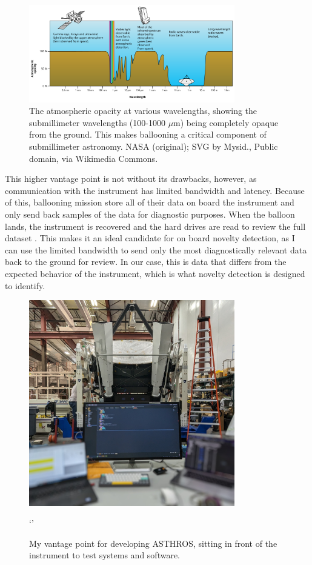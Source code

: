 \begin{figure}
\centering
\includegraphics[width=0.8\textwidth]{figs/intro/atmosphere.png}
\caption[Atmospheric Opacity at Various Wavelengths]{
    The atmospheric opacity at various wavelengths, showing the submillimeter wavelengths (100-1000 $\mu$m) being completely opaque from the ground.
    This makes ballooning a critical component of submillimeter astronomy. NASA (original); SVG by Mysid., Public domain, via Wikimedia Commons.
    \label{intro/fig:atmosphere}
}
\end{figure}

This higher vantage point is not without its drawbacks, however, as communication with the instrument has limited bandwidth and latency. 
Because of this, ballooning mission store all of their data on board the instrument and only send back samples of the data for diagnostic purposes.
When the balloon lands, the instrument is recovered and the hard drives are read to review the full dataset \parencite{walker_STO}.
This makes it an ideal candidate for on board novelty detection, as I can use the limited bandwidth to send only the most diagnostically relevant data back to the ground for review.
In our case, this is data that differs from the expected behavior of the instrument, which is what novelty detection is designed to identify.

\begin{figure}
\centering
\includegraphics[width=0.8\textwidth]{figs/intro/asthros_instrument.jpg}
\caption[Command Station for Software Development of ASTHROS]{
    My vantage point for developing ASTHROS, sitting in front of the instrument to test systems and software.
}`'
\label{intro/fig:asthros_instrument}
\end{figure}

